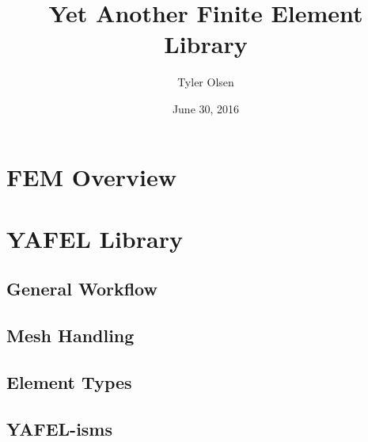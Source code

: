 \documentclass{beamer}
\title[YAFEL]{Yet Another Finite Element Library}
\author{Tyler Olsen}
\date{June 30, 2016}
\begin{document}
\begin{frame}
  \titlepage
\end{frame}

\section{FEM Overview}





\section{YAFEL Library}
\subsection{General Workflow}
\subsection{Mesh Handling}
\subsection{Element Types}
\subsection{YAFEL-isms}
\end{document}
